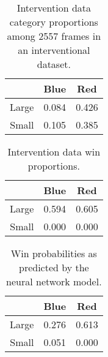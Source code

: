 \documentclass{article}
\begin{document}
\begin{table}
\centering
\begin{tabular}{r | c | c}
 & Blue & Red \\
\hline
Large & 0.084 & 0.426 \\
\hline
Small & 0.105 & 0.385
\end{tabular}
\caption{Intervention data category proportions among 2557 frames in an interventional dataset.}
\label{tab:exp1_int_prop}
\end{table}


\begin{table}
\centering
\begin{tabular}{r | c | c}
 & Blue & Red \\
\hline
Large & 0.594 & 0.605 \\
\hline
Small & 0.000 & 0.000
\end{tabular}
\caption{Intervention data win proportions.}
\label{tab:exp1_int_win}
\end{table}

\begin{table}
\centering
\begin{tabular}{r | c | c}
 & Blue & Red \\
\hline
Large & 0.276 & 0.613 \\
\hline
Small & 0.051 & 0.000
\end{tabular}
\caption{Win probabilities as predicted by the neural network model.}
\label{tab:exp1_int_model}
\end{table}

% 
% 
% 
% 
%
% 
% 
% 
% 
% 






















\end{document}
